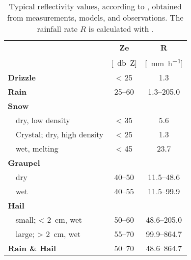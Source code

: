 \begin{table}[H]
	\begin{center}
		\caption{Typical reflectivity values, according to \cite{doviak_doppler_1993}, obtained from measurements, models, and observations. The rainfall rate $R$ is calculated with . }\label{tab:ref_values}
		\begin{tabular}{ll|c|c}
			\hline \hline
			\multicolumn{2}{l|}{} & \textbf{Ze} & \textbf{R} \\ 
			\multicolumn{2}{l|}{} & [\SI{}{\decibel Z}] & [\SI{}{\mm\per\hour}] \\ \hline \hline
			\multicolumn{2}{l|}{\textbf{Drizzle}} & \num{< 25} &  \num{1.3} \\ \hline
			\multicolumn{2}{l|}{\textbf{Rain}} & \numrange{25}{60} & \numrange{1.3}{205.0} \\ \hline
			\multicolumn{2}{l|}{\textbf{Snow}} &  \\ 
			& dry, low density 	& \num{< 35} & \num{5.6}\\ \hline
			& Crystal; dry, high density & \num{< 25} & \num{1.3}\\ \hline
			& wet, melting 		& \num{< 45} & \num{23.7} \\ \hline
			\multicolumn{2}{l|}{\textbf{Graupel}} & \\
			& dry 				& \numrange{40}{50} & \numrange{11.5}{48.6} \\ \hline
			& wet				& \numrange{40}{55} & \numrange{11.5}{99.9} \\ \hline
			\multicolumn{2}{l|}{\textbf{Hail}} & \\
			& small; \SI{< 2}{\cm}, wet & \numrange{50}{60} & \numrange{48.6}{205.0}\\
			& large; \SI{> 2}{\cm}, wet & \numrange{55}{70} & \numrange{99.9}{864.7}\\ \hline
			\multicolumn{2}{l|}{\textbf{Rain \& Hail}} & \numrange{50}{70} & \numrange{48.6}{864.7} \\ 
			\hline \hline
		\end{tabular}
	\end{center}
\end{table}

